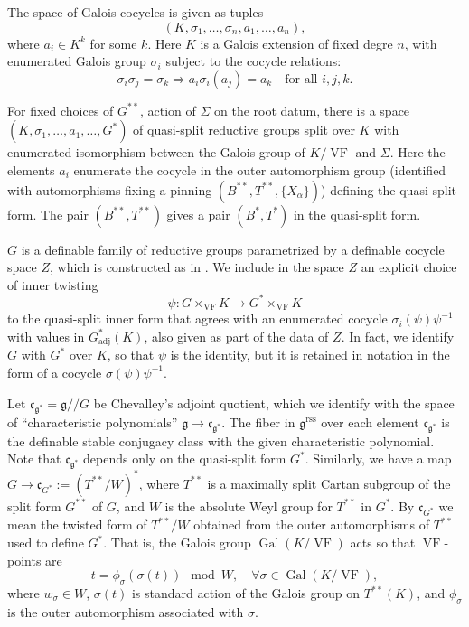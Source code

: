 \documentclass[12pt]{amsart}
\newcommand\blue[1]{{\color{blue}{#1}}}
\newcommand{\op}[1]{\operatorname{#1}}
\def\VF{{\op{VF}}}
\newcommand{\fg}{\mathfrak{g}}
\newcommand{\fc}{\mathfrak{c}}
\newcommand{\reg}{\mathrm{rss}}
\theoremstyle{plain}
\theoremstyle{definition}
\begin{document}
The space of Galois cocycles is given as tuples
\[
(K,\sigma_1,\ldots,\sigma_n,a_1,\ldots,a_n),
\]
where $a_i \in K^k$ for some $k$.  Here $K$ is a Galois extension of
fixed degre $n$, with enumerated Galois group $\sigma_i$ subject to
the cocycle relations:
\[
\sigma_i \sigma_j 
  = \sigma_k \Longrightarrow a_i \sigma_i(a_j) 
  = a_k\quad\text{for all } i,j,k.
\]

For fixed choices of $G^{**}$, action of $\Sigma$ on the root datum,
there is a space $(K,\sigma_1,\ldots,a_1,\ldots,G^*)$ of
quasi-split reductive groups split over $K$ with enumerated
isomorphism between the Galois group of $K/\VF$ and $\Sigma$.  Here
the elements $a_i$ enumerate the cocycle in the outer
automorphism group (identified with automorphisms fixing a pinning
$(B^{**},T^{**},\{X_\alpha\})$) defining the quasi-split form.  The
pair $(B^{**},T^{**})$ gives a pair $(B^*,T^*)$ in the quasi-split
form.

$G$ is a definable family of reductive groups parametrized by a
definable cocycle space $Z$, which is constructed as in \cite{CGH}.  We
include in the space $Z$ an explicit choice of inner twisting 
\[
\psi:G
\times_\VF K \to G^*\times_\VF K
\] to the quasi-split inner form that agrees with an enumerated
cocycle $\sigma_i(\psi) \psi^{-1}$ with values in $G^*_{\op{adj}}(K)$, also
given as part of the data of $Z$.  In fact, we identify $G$ with $G^*$
over $K$, so that $\psi$ is the identity, but it is retained in
notation in the form of a cocycle $\sigma(\psi)\psi^{-1}$.  

Let $\fc_{\fg^{*}} = \fg/\!/G$ be Chevalley's adjoint quotient, which
we identify with the space of ``characteristic polynomials'' $\fg\to
\fc_{\fg^{*}}$.  The fiber in $\fg^\reg$ over each element \blue{of}
$\fc_{\fg^{*}}$ is the definable stable conjugacy class with the given
characteristic polynomial.  Note that $\fc_{\fg^{*}}$ depends only on
the quasi-split form $G^*$. Similarly, we have a map $G\to \fc_{G^*}:= (T^{**}/W)^*$,
where $T^{**}$ is a maximally split Cartan subgroup of the split
form $G^{**}$ of $G$, and $W$ is the absolute Weyl group for $T^{**}$
in $G^*$.  By $\fc_{G^*}$ we mean the twisted form of $T^{**}/W$
obtained from the outer automorphisms of $T^{**}$ used to define
$G^*$.  That is, the Galois group $\op{Gal}(K/\VF)$ acts so that
$\VF$-points are
\[
t =  \phi_\sigma(\sigma(t))\mod W, \quad\forall \sigma\in\op{Gal}(K/\VF),
\]
where $w_\sigma\in W$, $\sigma(t)$ is standard action of the Galois
group on $T^{**}(K)$, and $\phi_\sigma$ is the outer automorphism
associated with $\sigma$.
\end{document}
